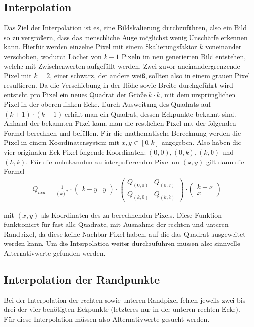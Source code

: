 \documentclass[course=erap]{aspdoc}
\begin{document}
\subsection{Interpolation}
Das Ziel der Interpolation ist es, eine Bildskalierung durchzuführen, also ein Bild so zu vergrößern, dass das menschliche Auge möglichst wenig Unschärfe erkennen kann. Hierfür werden einzelne Pixel mit einem Skalierungsfaktor $k$ voneinander verschoben, wodurch Löcher von $k-1$ Pixeln im neu generierten Bild entstehen, welche mit Zwischenwerten aufgefüllt werden. Zwei zuvor aneinandergrenzende Pixel mit $k = 2$, einer schwarz, der andere weiß, sollten also in einem grauen Pixel resultieren. Da die Verschiebung in der Höhe sowie Breite durchgeführt wird entsteht pro Pixel ein neues Quadrat der Größe $k \cdot k$, mit dem ursprünglichen Pixel in der oberen linken Ecke. Durch Ausweitung des Quadrats auf $(k+1) \cdot (k+1)$ erhält man
ein Quadrat, dessen Eckpunkte bekannt sind. Anhand der bekannten Pixel kann man die restlichen Pixel mit der folgenden Formel berechnen und befüllen. Für die mathematische Berechnung werden die Pixel in einem Koordinatensystem mit $x, y \in [0, k]$ angegeben. Also haben die vier originalen Eck-Pixel folgende Koordinaten: $(0, 0), (0, k), (k, 0)$ und $(k, k)$. Für die unbekannten zu interpolierenden Pixel an $(x, y)$ gilt dann die Formel
 \begin{align}
    Q_{neu} {=}  \frac{1}{(k)^2} \cdot
    \begin{pmatrix} k-y & y \end{pmatrix} \cdot
    \begin{pmatrix} Q_{(0,0)} & Q_{(0,k)} \\ Q_{(k,0)} & Q_{(k,k)} \end{pmatrix}
    \cdot
     \begin{pmatrix} k-x \\ x \end{pmatrix} 
\end{align}

 
mit $(x, y)$ als Koordinaten des zu berechnenden Pixels. Diese Funktion funktioniert für fast alle Quadrate, mit Ausnahme der rechten und unteren Randpixel, da diese keine Nachbar-Pixel haben, auf die das Quadrat ausgeweitet werden kann. Um die Interpolation weiter durchzuführen müssen also sinnvolle Alternativwerte gefunden werden.

\subsection{Interpolation der Randpunkte}
Bei der Interpolation der rechten sowie unteren Randpixel fehlen jeweils zwei bis drei der vier benötigten Eckpunkte (letzteres nur in der unteren rechten Ecke). Für diese Interpolation müssen also Alternativwerte gesucht werden.
\end{document}

